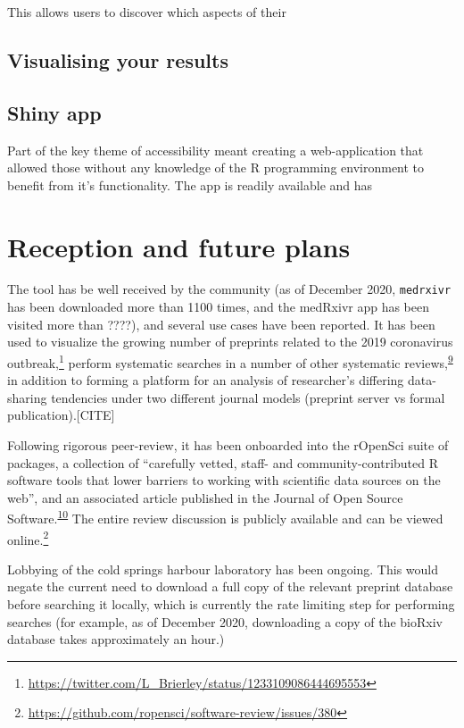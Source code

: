\documentclass[a4paper, twoside]{templates/ociamthesis}
\begin{document}
This allows users to discover which aspects of their

\hypertarget{visualising-your-results}{%
\subsection{Visualising your results}\label{visualising-your-results}}

\hypertarget{shiny-app}{%
\subsection{Shiny app}\label{shiny-app}}

Part of the key theme of accessibility meant creating a web-application that allowed those without any knowledge of the R programming environment to benefit from it's functionality.
The app is readily available and has

\hypertarget{reception-and-future-plans}{%
\section{Reception and future plans}\label{reception-and-future-plans}}

The tool has be well received by the community (as of December 2020, \texttt{medrxivr} has been downloaded more than 1100 times, and the medRxivr app has been visited more than ????), and several use cases have been reported. It has been used to visualize the growing number of preprints related to the 2019 coronavirus outbreak,\footnote{\url{https://twitter.com/L_Brierley/status/1233109086444695553}} perform systematic searches in a number of other systematic reviews,\textsuperscript{\protect\hyperlink{ref-noone2020}{9}} in addition to forming a platform for an analysis of researcher's differing data-sharing tendencies under two different journal models (preprint server vs formal publication).{[}CITE{]}

Following rigorous peer-review, it has been onboarded into the rOpenSci suite of packages, a collection of ``carefully vetted, staff- and community-contributed R software tools that lower barriers to working with scientific data sources on the web'', and an associated article published in the Journal of Open Source Software.\textsuperscript{\protect\hyperlink{ref-mcguinness2020a}{10}} The entire review discussion is publicly available and can be viewed online.\footnote{\url{https://github.com/ropensci/software-review/issues/380}}

Lobbying of the cold springs harbour laboratory has been ongoing. This would negate the current need to download a full copy of the relevant preprint database before searching it locally, which is currently the rate limiting step for performing searches (for example, as of December 2020, downloading a copy of the bioRxiv database takes approximately an hour.)
\end{document}
